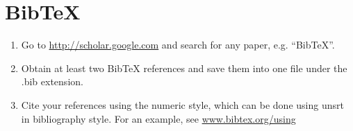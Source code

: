 \documentclass{article}
\begin{document}
\newpage

\section{BibTeX}
\begin{enumerate}
  \item Go to \url{http://scholar.google.com} and search for any paper, e.g. ``BibTeX''.
  \item Obtain at least two BibTeX references and save them into one file under the .bib extension.
  \item Cite your references using the numeric style, which can be done using unsrt in bibliography style. For an example, see \url{www.bibtex.org/using}
\end{enumerate}
\end{document}
